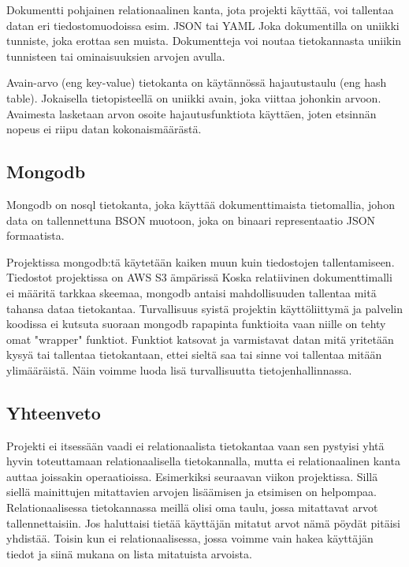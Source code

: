 Dokumentti pohjainen relationaalinen kanta, jota projekti käyttää, voi tallentaa datan eri tiedostomuodoissa esim. JSON tai YAML
Joka dokumentilla on uniikki tunniste, joka erottaa sen muista. 
Dokumentteja voi noutaa tietokannasta uniikin tunnisteen tai ominaisuuksien arvojen avulla.
\medskip

Avain-arvo (eng key-value) tietokanta on käytännössä hajautustaulu (eng hash table).
Jokaisella tietopisteellä on uniikki avain, joka viittaa johonkin arvoon. 
Avaimesta lasketaan arvon osoite hajautusfunktiota käyttäen, joten etsinnän nopeus ei riipu datan kokonaismäärästä.
\medskip




\subsection*{Mongodb}

Mongodb on nosql tietokanta, joka käyttää dokumenttimaista tietomallia, johon data on tallennettuna BSON muotoon, joka on binaari representaatio JSON formaatista.
\medskip

Projektissa mongodb:tä käytetään kaiken muun kuin tiedostojen tallentamiseen. Tiedostot projektissa on AWS S3 ämpärissä
Koska relatiivinen dokumenttimalli ei määritä tarkkaa skeemaa, mongodb antaisi mahdollisuuden tallentaa mitä tahansa dataa tietokantaa.
Turvallisuus syistä projektin käyttöliittymä ja palvelin koodissa ei kutsuta suoraan mongodb rapapinta funktioita vaan niille on tehty omat "wrapper"{} funktiot.
Funktiot katsovat ja varmistavat datan mitä yritetään kysyä tai tallentaa tietokantaan, ettei sieltä saa tai sinne voi tallentaa mitään ylimääräistä.
Näin voimme luoda lisä turvallisuutta tietojenhallinnassa.
\medskip



\subsection*{Yhteenveto}


Projekti ei itsessään vaadi ei relationaalista tietokantaa vaan sen pystyisi yhtä hyvin toteuttamaan relationaalisella tietokannalla, 
mutta ei relationaalinen kanta auttaa joissakin operaatioissa.
Esimerkiksi seuraavan viikon projektissa. Sillä siellä mainittujen mitattavien arvojen lisäämisen ja etsimisen on helpompaa.
Relationaalisessa tietokannassa meillä olisi oma taulu, jossa mitattavat arvot tallennettaisiin.
Jos haluttaisi tietää käyttäjän mitatut arvot nämä pöydät pitäisi yhdistää.
Toisin kun ei relationaalisessa, jossa voimme vain hakea käyttäjän tiedot ja siinä mukana on lista mitatuista arvoista.




